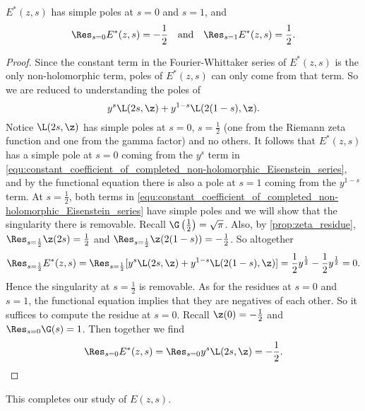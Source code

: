       \begin{proposition}\label{equ:completed_real-analytic_Eisenstein_series_residues}
        $E^{\ast}(z,s)$ has simple poles at $s = 0$ and $s = 1$, and
        \[
          \Res_{s = 0}E^{\ast}(z,s) = -\frac{1}{2} \quad \text{and} \quad \Res_{s = 1}E^{\ast}(z,s) = \frac{1}{2}.
        \]
      \end{proposition}
      \begin{proof}
        Since the constant term in the Fourier-Whittaker series of $E^{\ast}(z,s)$ is the only non-holomorphic term, poles of $E^{\ast}(z,s)$ can only come from that term. So we are reduced to understanding the poles of
        \begin{equation}\label{equ:constant_coefficient_of_completed_non-holomorphic_Eisenstein_series}
          y^{s}\L(2s,\z)+y^{1-s}\L(2(1-s),\z).
        \end{equation}
        Notice $\L(2s,\z)$ has simple poles at $s = 0$, $s = \frac{1}{2}$ (one from the Riemann zeta function and one from the gamma factor) and no others. It follows that $E^{\ast}(z,s)$ has a simple pole at $s = 0$ coming from the $y^{s}$ term in
        \cref{equ:constant_coefficient_of_completed_non-holomorphic_Eisenstein_series}, and by the functional equation there is also a pole at $s = 1$ coming from the $y^{1-s}$ term. At $s = \frac{1}{2}$, both terms in \cref{equ:constant_coefficient_of_completed_non-holomorphic_Eisenstein_series} have simple poles and we will show that the singularity there is removable. Recall $\G\left(\frac{1}{2}\right) = \sqrt{\pi}$. Also, by \cref{prop:zeta_residue}, $\Res_{s = \frac{1}{2}}\z(2s) = \frac{1}{2}$ and $\Res_{s = \frac{1}{2}}\z(2(1-s)) = -\frac{1}{2}$. So altogether
        \[
          \Res_{s = \frac{1}{2}}E^{\ast}(z,s) = \Res_{s = \frac{1}{2}}[y^{s}\L(2s,\z)+y^{1-s}\L(2(1-s),\z)] = \frac{1}{2}y^{\frac{1}{2}}-\frac{1}{2}y^{\frac{1}{2}} = 0.
        \]
        Hence the singularity at $s = \frac{1}{2}$ is removable. As for the residues at $s = 0$ and $s = 1$, the functional equation implies that they are negatives of each other. So it suffices to compute the residue at $s = 0$. Recall $\z(0) = -\frac{1}{2}$ and $\Res_{s = 0}\G(s) = 1$. Then together we find
        \[
          \Res_{s = 0}E^{\ast}(z,s) = \Res_{s = 0}y^{s}\L(2s,\z) = -\frac{1}{2}.
        \]
      \end{proof}

      This completes our study of $E(z,s)$.

